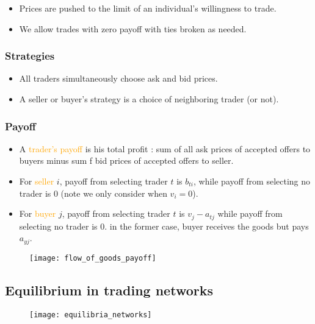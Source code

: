 \begin{itemize}
\item Prices are pushed to the limit of an individual's willingness to trade.
\item We allow trades with zero payoff with ties broken as needed.
\end{itemize}

\subsubsection{Strategies}

\begin{itemize}
\item All traders simultaneously choose ask and bid prices.
\item A seller or buyer's strategy is a choice of neighboring trader (or not).
\end{itemize}

\subsubsection{Payoff}

\begin{itemize}
\item A \textcolor{orange}{trader's payoff} is his total profit : sum of all ask prices of accepted offers to buyers minus sum f bid prices of accepted offers to seller.
\item For \textcolor{orange}{seller} $i$, payoff from selecting trader $t$ is $b_{ti}$, while payoff from selecting no trader is $0$ (note we only consider when $v_i = 0$).
\item For \textcolor{orange}{buyer} $j$, payoff from selecting trader $t$ is $v_j - a_{tj}$ while payoff from selecting no trader is $0$. in the former case, buyer receives the goods but pays $a_{yj}$.
\end{itemize}

\begin{figure}[H]
    \centering
    \texttt{[image: flow\_of\_goods\_payoff]}
\end{figure}

\subsection{Equilibrium in trading networks}

\begin{figure}[H]
    \centering
    \texttt{[image: equilibria\_networks]}
\end{figure}

